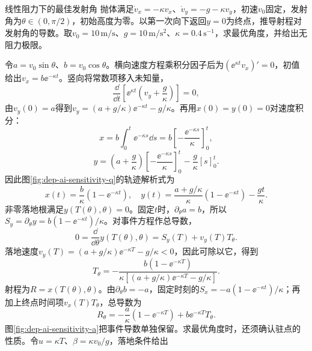 \begin{example}线性阻力下的最佳发射角
抛体满足$\dot v_x=-\kappa v_x$、$\dot v_y=-g-\kappa v_y$，初速$v_0$固定，发射角为$\theta\in(0,\pi/2)$，初始高度为零。以第一次向下返回$y=0$为终点，推导射程对发射角的导数。取$v_0=10\,\mathrm{m/s}$、$g=10\,\mathrm{m/s^2}$、$\kappa=0.4\,\mathrm{s^{-1}}$，求最优角度，并给出无阻力极限。
\end{example}
\begin{solution}
令$a=v_0\sin\theta$、$b=v_0\cos\theta$。横向速度方程乘积分因子后为$(\ee^{\kappa t}v_x)'=0$，初值给出$v_x=b\ee^{-\kappa t}$。竖向将常数项移入未知量，
\[\frac{\dd}{\dd t}\left[\ee^{\kappa t}\left(v_y+\frac g\kappa\right)\right]=0,\]
由$v_y(0)=a$得到$v_y=(a+g/\kappa)\ee^{-\kappa t}-g/\kappa$。再用$x(0)=y(0)=0$对速度积分：
\[x=b\int_0^t\ee^{-\kappa s}\dd s
=b\left[-\frac{\ee^{-\kappa s}}\kappa\right]_0^t,\]
\[y=\left(a+\frac g\kappa\right)
\left[-\frac{\ee^{-\kappa s}}\kappa\right]_0^t
-\frac g\kappa[s]_0^t.\]
因此图\ref{fig:dep-ai-sensitivity-q}的轨迹解析式为
\[
 x(t)=\frac b\kappa(1-\ee^{-\kappa t}),\quad
 y(t)=\frac{a+g/\kappa}{\kappa}(1-\ee^{-\kappa t})-\frac{gt}{\kappa}.
\]
非零落地根满足$y(T(\theta),\theta)=0$。固定$t$时，$\partial_\theta a=b$，所以$S_y=\partial_\theta y=b(1-\ee^{-\kappa t})/\kappa$。对事件方程作总导数，
\[0=\frac{\dd}{\dd\theta}y(T(\theta),\theta)
=S_y(T)+v_y(T)T_\theta.\]
落地速度$v_y(T)=(a+g/\kappa)\ee^{-\kappa T}-g/\kappa<0$，因此可除以它，得到
\[
 T_\theta=-\frac{b(1-\ee^{-\kappa T})}
 {\kappa[(a+g/\kappa)\ee^{-\kappa T}-g/\kappa]}.
\]
射程为$R=x(T(\theta),\theta)$。由$\partial_\theta b=-a$，固定时刻的$S_x=-a(1-\ee^{-\kappa t})/\kappa$；再加上终点时间项$v_x(T)T_\theta$，总导数为
\[
 R_\theta=-\frac{a}{\kappa}(1-\ee^{-\kappa T})
 +b\ee^{-\kappa T}T_\theta.
\]
图\ref{fig:dep-ai-sensitivity-a}把事件导数单独保留。求最优角度时，还须确认驻点的性质。令$u=\kappa T$、$\beta=\kappa v_0/g$，落地条件给出

\end{solution}
